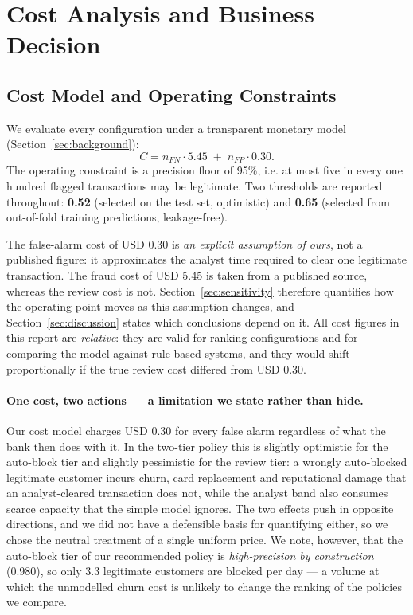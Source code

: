 \section{Cost Analysis and Business Decision}
\label{sec:cost}

\subsection{Cost Model and Operating Constraints}

We evaluate every configuration under a transparent monetary model
(Section~\ref{sec:background}):
\[
    C = n_{FN}\cdot 5.45 \;+\; n_{FP}\cdot 0.30 .
\]
The operating constraint is a precision floor of 95\%, i.e. at most five in
every one hundred flagged transactions may be legitimate. Two thresholds are
reported throughout: \textbf{0.52} (selected on the test set, optimistic) and
\textbf{0.65} (selected from out-of-fold training predictions, leakage-free).

The false-alarm cost of USD 0.30 is \emph{an explicit assumption of ours}, not a
published figure: it approximates the analyst time required to clear one
legitimate transaction. The fraud cost of USD 5.45 is taken from a published
source, whereas the review cost is not. Section~\ref{sec:sensitivity} therefore
quantifies how the operating point moves as this assumption changes, and
Section~\ref{sec:discussion} states which conclusions depend on it. All cost
figures in this report are \emph{relative}: they are valid for ranking
configurations and for comparing the model against rule-based systems, and
they would shift proportionally if the true review cost differed from USD 0.30.

\paragraph{One cost, two actions --- a limitation we state rather than hide.}
Our cost model charges USD 0.30 for every false alarm regardless of what the
bank then does with it. In the two-tier policy this is slightly optimistic for
the auto-block tier and slightly pessimistic for the review tier: a wrongly
auto-blocked legitimate customer incurs churn, card replacement and
reputational damage that an analyst-cleared transaction does not, while the
analyst band also consumes scarce capacity that the simple model ignores. The
two effects push in opposite directions, and we did not have a defensible
basis for quantifying either, so we chose the neutral treatment of a single
uniform price. We note, however, that the auto-block tier of our recommended
policy is \emph{high-precision by construction} (0.980), so only 3.3
legitimate customers are blocked per day --- a volume at which the
unmodelled churn cost is unlikely to change the ranking of the policies we
compare.

